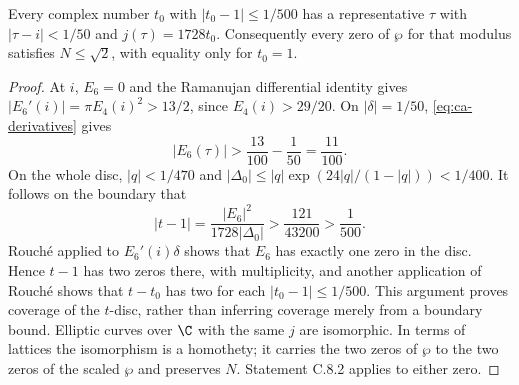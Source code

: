\begin{statement}
Every complex number $t_0$ with $|t_0-1|\le1/500$ has a
representative $\tau$ with $|\tau-i|<1/50$ and $j(\tau)=1728t_0$.
Consequently every zero of $\wp$ for that modulus satisfies
$N\le\sqrt2$, with equality only for $t_0=1$.
\end{statement}
\begin{proof}
At $i$, $E_6=0$ and the Ramanujan differential identity gives
$|E_6'(i)|=\pi E_4(i)^2>13/2$, since $E_4(i)>29/20$.
On $|\delta|=1/50$, \eqref{eq:ca-derivatives} gives
\[
 |E_6(\tau)|>\frac{13}{100}-\frac1{50}=\frac{11}{100}.
\]
On the whole disc, $|q|<1/470$ and
$|\Delta_0|\le |q|\exp(24|q|/(1-|q|))<1/400$.
It follows on the boundary that
\[
 |t-1|=\frac{|E_6|^2}{1728|\Delta_0|}
 >\frac{121}{43200}>\frac1{500}.
\]
Rouch\'e applied to $E_6'(i)\delta$ shows that $E_6$ has
exactly one zero in the disc. Hence $t-1$ has two zeros there,
with multiplicity, and another application of Rouch\'e shows
that $t-t_0$ has two for each $|t_0-1|\le1/500$.
This argument proves coverage of the $t$-disc, rather than
inferring coverage merely from a boundary bound. Elliptic
curves over $\C$ with the same $j$ are isomorphic. In terms of
lattices the isomorphism is a homothety; it carries the two
zeros of $\wp$ to the two zeros of the scaled $\wp$ and
preserves $N$. Statement C.8.2 applies to either zero.
\end{proof}
